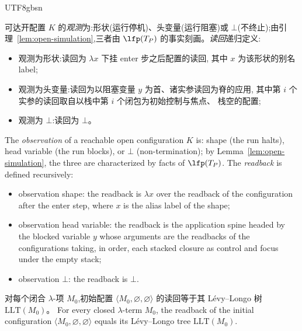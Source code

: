 \begin{CJK*}{UTF8}{gbsn}
\begin{definition}
  \label{def:llt-readback}
  \ifPaperChinese
  可达开配置 $K$ 的\emph{观测}为:形状(运行停机)、头变量(运行阻塞)或
  $\bot$(不终止);由引理~\ref{lem:open-simulation},三者由 $\lfp(T_P)$
  的事实刻画。\emph{读回}递归定义:
  \begin{itemize}
    \item 观测为形状:读回为 $\lambda x$ 下挂 enter 步之后配置的读回,
      其中 $x$ 为该形状的别名 label;
    \item 观测为头变量:读回为以阻塞变量 $y$ 为首、诸实参读回为脊的应用,
      其中第 $i$ 个实参的读回取自以栈中第 $i$ 个闭包为初始控制与焦点、
      栈空的配置;
    \item 观测为 $\bot$:读回为 $\bot$。
  \end{itemize}
  \else
  The \emph{observation} of a reachable open configuration $K$ is:
  shape (the run halts), head variable (the run blocks), or $\bot$
  (non-termination); by Lemma~\ref{lem:open-simulation}, the three
  are characterized by facts of $\lfp(T_P)$. The \emph{readback} is defined
  recursively:
  \begin{itemize}
    \item observation shape: the readback is $\lambda x$ over the
      readback of the configuration after the enter step, where $x$
      is the alias label of the shape;
    \item observation head variable: the readback is the
      application spine headed by the blocked variable $y$ whose
      arguments are the readbacks of the configurations taking, in
      order, each stacked closure as control and focus under the
      empty stack;
    \item observation $\bot$: the readback is $\bot$.
  \end{itemize}
  \fi
\end{definition}

\begin{theorem}
  \label{thm:llt-correspondence}
  \ifPaperChinese
  对每个闭合 $\lambda$-项 $M_0$,初始配置
  $\langle M_0, \varnothing, \varnothing \rangle$ 的读回等于其
  Lévy--Longo 树 $\mathrm{LLT}(M_0)$。
  \else
  For every closed $\lambda$-term $M_0$, the readback of the initial
  configuration $\langle M_0, \varnothing, \varnothing \rangle$
  equals its Lévy--Longo tree $\mathrm{LLT}(M_0)$.
  \fi
\end{theorem}


\end{CJK*}
